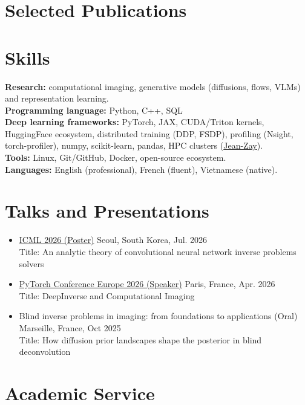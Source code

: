 \documentclass[a4paper,11pt]{article}
\begin{document}
\section{Selected Publications}
\begin{refsection}
\nocite{*}
\printbibliography[heading=none]
\end{refsection}

\section{Skills}
\textbf{Research:}
computational imaging, generative models (diffusions, flows, VLMs) and representation learning. \\
\textbf{Programming language:} Python, C++, SQL \\
\textbf{Deep learning frameworks:}
PyTorch, JAX, CUDA/Triton kernels, HuggingFace ecosystem, 
distributed training (DDP, FSDP), profiling (Nsight, torch-profiler), numpy, scikit-learn, pandas, HPC clusters (\href{http://www.idris.fr/eng/jean-zay/jean-zay-presentation-eng.html}{Jean-Zay}). \\
\textbf{Tools:}
Linux, Git/GitHub, Docker, open-source ecosystem. \\
\textbf{Languages:}
English (professional), French (fluent), Vietnamese (native).

\section{Talks and Presentations}
\begin{itemize}
    \item \href{https://icml.cc/}{ICML 2026 (Poster)} \hfill Seoul, South Korea, Jul. 2026
    \\ Title: An analytic theory of convolutional neural network inverse problems solvers
    \item \href{https://events.linuxfoundation.org/pytorch-conference-europe/program/schedule/}{PyTorch Conference Europe 2026 (Speaker)} \hfill Paris, France, Apr. 2026
    \\ Title: DeepInverse and Computational Imaging
    \item Blind inverse problems in imaging: from foundations to applications (Oral) \hfill Marseille, France, Oct 2025
    \\ Title: How diffusion prior landscapes shape the posterior in blind deconvolution
\end{itemize}

\section{Academic Service}
\end{document}
